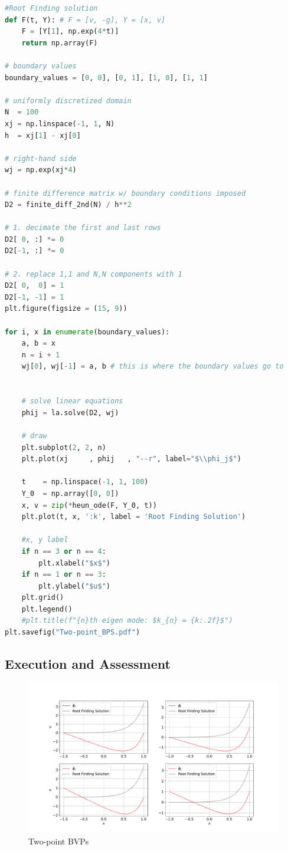 \documentclass[11pt]{article}
\begin{document}
\begin{lstlisting}[language=Python]
#Root Finding solution
def F(t, Y): # F = [v, -g], Y = [x, v]
    F = [Y[1], np.exp(4*t)]
    return np.array(F)

# boundary values
boundary_values = [0, 0], [0, 1], [1, 0], [1, 1]

# uniformly discretized domain
N  = 100
xj = np.linspace(-1, 1, N)
h  = xj[1] - xj[0]

# right-hand side
wj = np.exp(xj*4)

# finite difference matrix w/ boundary conditions imposed
D2 = finite_diff_2nd(N) / h**2

# 1. decimate the first and last rows
D2[ 0, :] *= 0
D2[-1, :] *= 0

# 2. replace 1,1 and N,N components with 1
D2[ 0,  0] = 1
D2[-1, -1] = 1
plt.figure(figsize = (15, 9))

for i, x in enumerate(boundary_values):
    a, b = x
    n = i + 1
    wj[0], wj[-1] = a, b # this is where the boundary values go to


    # solve linear equations
    phij = la.solve(D2, wj)

    # draw
    plt.subplot(2, 2, n)
    plt.plot(xj     , phij   , "--r", label="$\\phi_j$")
    
    t    = np.linspace(-1, 1, 100)
    Y_0  = np.array([0, 0])
    x, v = zip(*heun_ode(F, Y_0, t))
    plt.plot(t, x, ':k', label = 'Root Finding Solution')  
    
    #x, y label
    if n == 3 or n == 4:
        plt.xlabel("$x$")
    if n == 1 or n == 3:
        plt.ylabel("$u$")
    plt.grid()
    plt.legend()
    #plt.title(f"{n}th eigen mode: $k_{n} = {k:.2f}$")
plt.savefig("Two-point_BPS.pdf")
\end{lstlisting}
\pagebreak
\subsection{Execution and Assessment}
\begin{figure}[!ht]
  \centering
  \includegraphics[width=1\textwidth]{Two-point_BPS.pdf}
  \caption{Two-point BVPs}
\end{figure}
\end{document}
